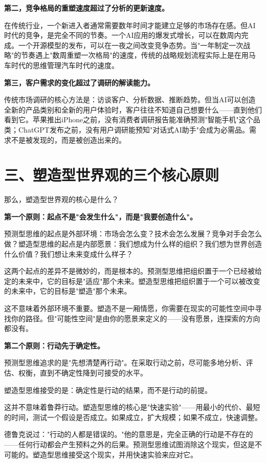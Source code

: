\textbf{第二，竞争格局的重塑速度超过了分析的更新速度。}

在传统行业，一个新进入者通常需要数年时间才能建立足够的市场存在感。但AI时代的竞争，是完全不同的节奏。一个AI应用的爆发式增长，可以在数周内完成。一个开源模型的发布，可以在一夜之间改变竞争态势。当"一年制定一次战略"的节奏遇上"数周重塑一次格局"的速度，传统的战略规划流程实际上是在用马车时代的思维管理汽车时代的速度。

\textbf{第三，客户需求的变化超过了调研的解读能力。}

传统市场调研的核心方法是：访谈客户、分析数据、推断趋势。但当AI可以创造全新的产品类别和全新的用户体验时，客户往往不知道自己想要什么——直到他们看到它。苹果推出iPhone之前，没有消费者调研报告能准确预测"智能手机"这个品类；ChatGPT发布之前，没有用户调研能预知"对话式AI助手"会成为必需品。需求不是被发现的，而是被创造出来的。


\section{三、塑造型世界观的三个核心原则}


那么，塑造型世界观的核心是什么？

\textbf{第一个原则：起点不是"会发生什么"，而是"我要创造什么"。}

预测型思维的起点是外部环境：市场会怎么变？技术会怎么发展？竞争对手会怎么做？塑造型思维的起点是内部愿景：我们想成为什么样的组织？我们想为世界创造什么价值？我们想让未来变成什么样子？

这两个起点的差异不是微妙的，而是根本的。预测型思维把组织置于一个已经被给定的未来中，它的目标是"适应"那个未来。塑造型思维把组织置于一个可以被改变的未来中，它的目标是"塑造"那个未来。

这不意味着外部环境不重要。塑造不是一厢情愿，你需要在现实的可能性空间中寻找你的路径。但"可能性空间"是由你的愿景来定义的——没有愿景，连探索的方向都没有。

\textbf{第二个原则：行动先于确定性。}

预测型思维追求的是"先想清楚再行动"。在采取行动之前，尽可能多地分析、评估、权衡，直到不确定性降到可接受的水平。

塑造型思维接受的是：确定性是行动的结果，而不是行动的前提。

这并不意味着鲁莽行动。塑造型思维的核心是"快速实验"——用最小的代价、最短的时间，测试一个假设是否成立。如果成立，扩大规模；如果不成立，快速调整。

德鲁克说过："行动的人都是错误的。"他的意思是，完全正确的行动是不存在的——任何行动都会产生预料之外的后果。预测型思维试图消除这个现实，但这是不可能的。塑造型思维接受这个现实，并用快速实验来应对它。

